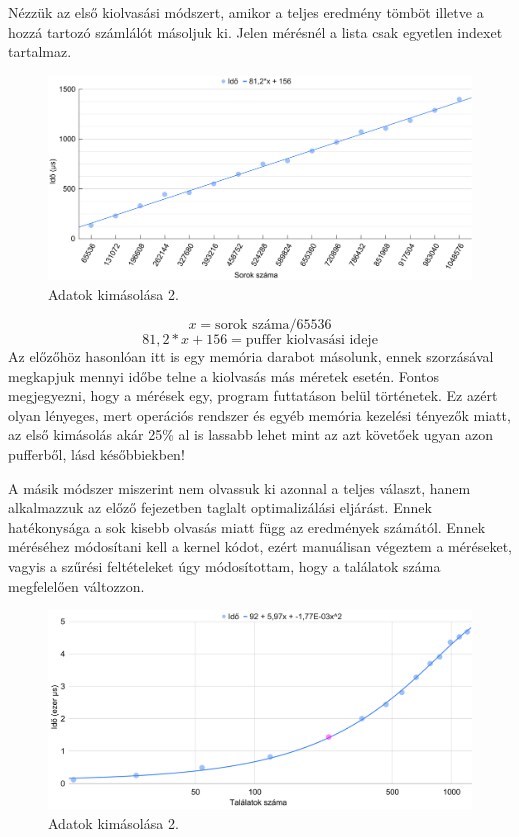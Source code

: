 Nézzük az első kiolvasási módszert, amikor a teljes eredmény tömböt illetve a hozzá tartozó számlálót másoljuk ki.
Jelen mérésnél a lista csak egyetlen indexet tartalmaz. 

\begin{figure}[h!]
\centering
\includegraphics[width=14.8cm]{images/graph/pufferout.png}
\caption{Adatok kimásolása 2.}
\label{fig:schema}
\end{figure}

$$ x = \text{sorok száma} / 65536 $$
$$ 81,2*x + 156 = \text{puffer kiolvasási ideje} $$ 
Az előzőhöz hasonlóan itt is egy memória darabot másolunk, ennek szorzásával megkapjuk mennyi időbe telne a kiolvasás más méretek esetén.
Fontos megjegyezni, hogy a mérések egy, program futtatáson belül történetek. Ez azért olyan lényeges, mert operációs rendszer és egyéb memória kezelési tényezők miatt, az első kimásolás akár 25\% al is lassabb lehet mint az azt követőek ugyan azon pufferből, lásd későbbiekben!

A másik módszer miszerint nem olvassuk ki azonnal a teljes választ, hanem alkalmazzuk az előző fejezetben taglalt optimalizálási eljárást.
Ennek hatékonysága a sok kisebb olvasás miatt függ az eredmények számától. Ennek méréséhez módosítani kell a kernel kódot, ezért manuálisan végeztem a méréseket, vagyis a szűrési feltételeket úgy módosítottam, hogy a találatok száma megfelelően változzon.

\begin{figure}[h!]
\centering
\includegraphics[width=14.8cm]{images/graph/outpuffer2_1.png}
\caption{Adatok kimásolása 2.}
\label{fig:schema}
\end{figure}

